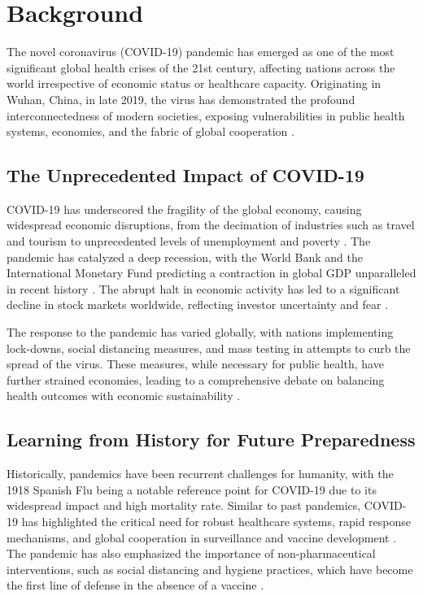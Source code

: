 \chapter{Background}

The novel coronavirus (COVID-19) pandemic has emerged as one of the most significant global health crises of the 21st century, affecting nations across the world irrespective of economic status or healthcare capacity. Originating in Wuhan, China, in late 2019, the virus has demonstrated the profound interconnectedness of modern societies, exposing vulnerabilities in public health systems, economies, and the fabric of global cooperation \parencite{Verma2021AReturns, Shrestha2020TheGlobalization, LegeseFeyisa2020TheReview, MaitalEllaBarzani2020EResearch}.  

\section{The Unprecedented Impact of COVID-19}

COVID-19 has underscored the fragility of the global economy, causing widespread economic disruptions, from the decimation of industries such as travel and tourism to unprecedented levels of unemployment and poverty \parencite{Verma2021AReturns, LegeseFeyisa2020TheReview}. The pandemic has catalyzed a deep recession, with the World Bank and the International Monetary Fund predicting a contraction in global GDP unparalleled in recent history \parencite{Verma2021AReturns, Shrestha2020TheGlobalization, LegeseFeyisa2020TheReview, MaitalEllaBarzani2020EResearch}. The abrupt halt in economic activity has led to a significant decline in stock markets worldwide, reflecting investor uncertainty and fear \parencite{Verma2021AReturns}.

The response to the pandemic has varied globally, with nations implementing lock-downs, social distancing measures, and mass testing in attempts to curb the spread of the virus. These measures, while necessary for public health, have further strained economies, leading to a comprehensive debate on balancing health outcomes with economic sustainability \parencite{Shrestha2020TheGlobalization, LegeseFeyisa2020TheReview}.

\section{Learning from History for Future Preparedness}

Historically, pandemics have been recurrent challenges for humanity, with the 1918 Spanish Flu being a notable reference point for COVID-19 due to its widespread impact and high mortality rate. Similar to past pandemics, COVID-19 has highlighted the critical need for robust healthcare systems, rapid response mechanisms, and global cooperation in surveillance and vaccine development \parencite{Shrestha2020TheGlobalization, MaitalEllaBarzani2020EResearch}. The pandemic has also emphasized the importance of non-pharmaceutical interventions, such as social distancing and hygiene practices, which have become the first line of defense in the absence of a vaccine \parencite{LegeseFeyisa2020TheReview, MaitalEllaBarzani2020EResearch}.

